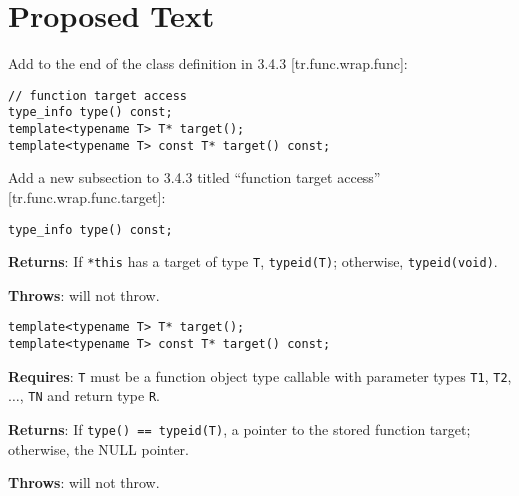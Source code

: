 \documentclass{article}
\begin{document}
\section{Proposed Text}
Add to the end of the class definition in 3.4.3 [tr.func.wrap.func]:
\begin{verbatim}
// function target access
type_info type() const;
template<typename T> T* target();
template<typename T> const T* target() const;
\end{verbatim}

Add a new subsection to 3.4.3 titled ``function target access''  
[tr.func.wrap.func.target]:

\begin{verbatim}
type_info type() const;
\end{verbatim}

\noindent\textbf{Returns}: If \texttt{*this} has a target of type
\texttt{T}, \texttt{typeid(T)}; otherwise, \texttt{typeid(void)}.

\noindent\textbf{Throws}: will not throw.

\begin{verbatim}
template<typename T> T* target();
template<typename T> const T* target() const;
\end{verbatim}

\noindent\textbf{Requires}: \texttt{T} must be a function object type
callable with parameter types \texttt{T1}, \texttt{T2}, $\ldots$,
\texttt{TN} and return type \texttt{R}.

\noindent\textbf{Returns}: If \texttt{type() == typeid(T)}, a pointer
to the stored function target; otherwise, the NULL pointer.

\noindent\textbf{Throws}: will not throw.



\end{document}
